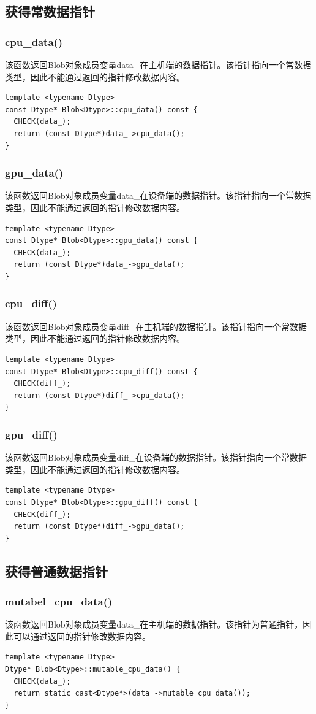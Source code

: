 \subsection{获得常数据指针}
\subsubsection{cpu\_data()}
该函数返回Blob对象成员变量data\_在主机端的数据指针。该指针指向一个常数据类型，因此不能通过返回的指针修改数据内容。
\begin{verbatim}
template <typename Dtype>
const Dtype* Blob<Dtype>::cpu_data() const {
  CHECK(data_);
  return (const Dtype*)data_->cpu_data();
}
\end{verbatim}
\subsubsection{gpu\_data()}
该函数返回Blob对象成员变量data\_在设备端的数据指针。该指针指向一个常数据类型，因此不能通过返回的指针修改数据内容。
\begin{verbatim}
template <typename Dtype>
const Dtype* Blob<Dtype>::gpu_data() const {
  CHECK(data_);
  return (const Dtype*)data_->gpu_data();
}
\end{verbatim}
\subsubsection{cpu\_diff()}
该函数返回Blob对象成员变量diff\_在主机端的数据指针。该指针指向一个常数据类型，因此不能通过返回的指针修改数据内容。
\begin{verbatim}
template <typename Dtype>
const Dtype* Blob<Dtype>::cpu_diff() const {
  CHECK(diff_);
  return (const Dtype*)diff_->cpu_data();
}
\end{verbatim}
\subsubsection{gpu\_diff()}
该函数返回Blob对象成员变量diff\_在设备端的数据指针。该指针指向一个常数据类型，因此不能通过返回的指针修改数据内容。
\begin{verbatim}
template <typename Dtype>
const Dtype* Blob<Dtype>::gpu_diff() const {
  CHECK(diff_);
  return (const Dtype*)diff_->gpu_data();
}
\end{verbatim}
\subsection{获得普通数据指针}
\subsubsection{mutabel\_cpu\_data()}
该函数返回Blob对象成员变量data\_在主机端的数据指针。该指针为普通指针，因此可以通过返回的指针修改数据内容。
\begin{verbatim}
template <typename Dtype>
Dtype* Blob<Dtype>::mutable_cpu_data() {
  CHECK(data_);
  return static_cast<Dtype*>(data_->mutable_cpu_data());
}
\end{verbatim}
